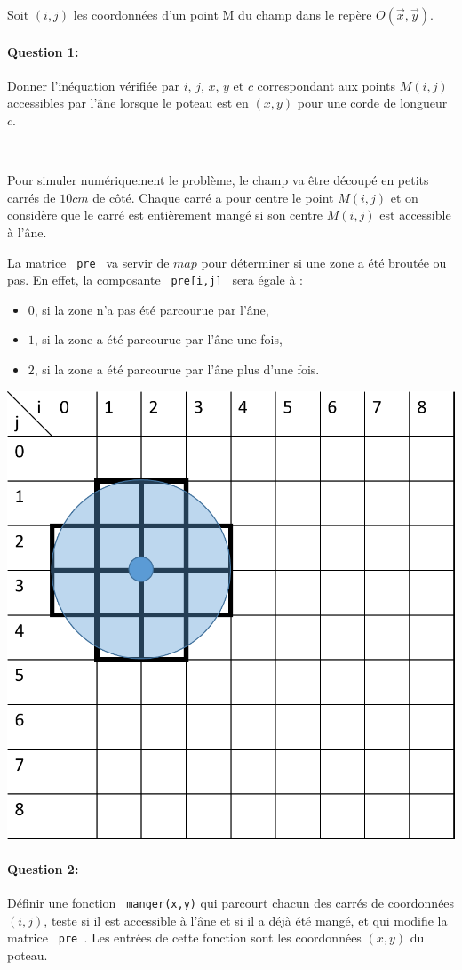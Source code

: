 Soit $(i,j)$ les coordonnées d'un point M du champ dans le repère $O(\overrightarrow{x}, \overrightarrow{y})$.

\paragraph{Question 1:} Donner l'inéquation vérifiée par $i$, $j$, $x$, $y$ et $c$ correspondant aux points $M(i,j)$ accessibles par l'âne lorsque le poteau est en $(x,y)$ pour une corde de longueur $c$.

~\

Pour simuler numériquement le problème, le champ va être découpé en petits carrés de $10cm$ de côté. Chaque carré a pour centre le point $M(i,j)$ et on considère que le carré est entièrement mangé si son centre $M(i,j)$ est accessible à l'âne.

La matrice \verb? pre ? va servir de $map$ pour déterminer si une zone a été broutée ou pas. En effet, la composante \verb? pre[i,j] ? sera égale à :
\begin{itemize}
 \item $0$, si la zone n'a pas été parcourue par l'âne,
 \item $1$, si la zone a été parcourue par l'âne une fois,
 \item $2$, si la zone a été parcourue par l'âne plus d'une fois.
\end{itemize}

\begin{center}
 \includegraphics[width=0.5\linewidth]{img/Figure1}
\end{center}

\paragraph{Question 2:} Définir une fonction \verb? manger(x,y)? qui parcourt chacun des carrés de coordonnées $(i,j)$, teste si il est accessible à l'âne et si il a déjà été mangé, et qui modifie la matrice \verb? pre ?. Les entrées de cette fonction sont les coordonnées $(x,y)$ du poteau. 


